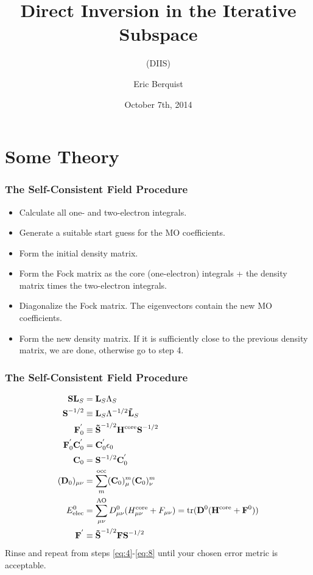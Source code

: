 \documentclass[10pt,compress,red]{beamer}
\title{Direct Inversion in the Iterative Subspace}
\subtitle{(DIIS)}
\author{Eric Berquist}
\institute{University of Pittsburgh}
\date{October 7th, 2014}
\makeatletter
\newcommand\listofframes{\@starttoc{lbf}}
\makeatother
\begin{document}
\frame{
  \titlepage
}

\begin{frame}
  \tableofcontents
\end{frame}

\section{Some Theory}

\begin{frame}
  \frametitle{The Self-Consistent Field Procedure}
  \begin{itemize}
    \item Calculate all one- and two-electron integrals.
    \item Generate a suitable start guess for the MO coefficients.
    \item Form the initial density matrix.
    \item Form the Fock matrix as the core (one-electron) integrals +
      the density matrix times the two-electron integrals.
    \item Diagonalize the Fock matrix. The eigenvectors contain the
      new MO coefficients.
    \item Form the new density matrix. If it is sufficiently close to
      the previous density matrix, we are done, otherwise go to step
      4.
  \end{itemize}
\end{frame}

\begin{frame}
  \frametitle{The Self-Consistent Field Procedure}
\begin{align}
  \label{eq:1}
  \boldsymbol{\mathbf{S}} \boldsymbol{\mathbf{L}}_{S} &= \boldsymbol{\mathbf{L}}_{S} \Lambda_{S} \\
  \label{eq:2}
  \boldsymbol{\mathbf{S}}^{-1/2} &\equiv \boldsymbol{\mathbf{L}}_{S} \Lambda^{-1/2} \boldsymbol{\mathbf{\tilde{L}}}_{S} \\
  \label{eq:3}
  \boldsymbol{\mathbf{F}}_{0}^{'} &\equiv \boldsymbol{\mathbf{\tilde{S}}}^{-1/2} \boldsymbol{\mathbf{H}}^{\textrm{core}} \boldsymbol{\mathbf{S}}^{-1/2} \\
  \label{eq:4}
  \boldsymbol{\mathbf{F}}_{0}^{'} \boldsymbol{\mathbf{C}}_{0}^{'} &= \boldsymbol{\mathbf{C}}_{0}^{'} \epsilon_{0} \\
  \label{eq:5}
  \boldsymbol{\mathbf{C}}_{0} &= \boldsymbol{\mathbf{S}}^{-1/2} \boldsymbol{\mathbf{C}}_{0}^{'} \\
  \label{eq:6}
  (\boldsymbol{\mathbf{D}}_{0})_{\mu\nu} &= \sum_{m}^{\textrm{occ}} (\boldsymbol{\mathbf{C}}_{0})_{\mu}^{m} (\boldsymbol{\mathbf{C}}_{0})_{\nu}^{m} \\
  \label{eq:7}
  E_{\textrm{elec}}^{0} &= \sum_{\mu\nu}^{\textrm{AO}} D_{\mu\nu}^{0} (H_{\mu\nu}^{\textrm{core}} + F_{\mu\nu}) = \mathrm{tr}(\boldsymbol{\mathbf{D}}^{0}(\boldsymbol{\mathbf{H}}^{\textrm{core}} + \boldsymbol{\mathbf{F}}^{0})) \\
  \label{eq:8}
  \boldsymbol{\mathbf{F}}^{'} &\equiv \boldsymbol{\mathbf{\tilde{S}}}^{-1/2} \boldsymbol{\mathbf{F}} \boldsymbol{\mathbf{S}}^{-1/2}
\end{align}
Rinse and repeat from steps \ref{eq:4}-\ref{eq:8} until your chosen error
metric is acceptable.
\end{frame}
\end{document}

